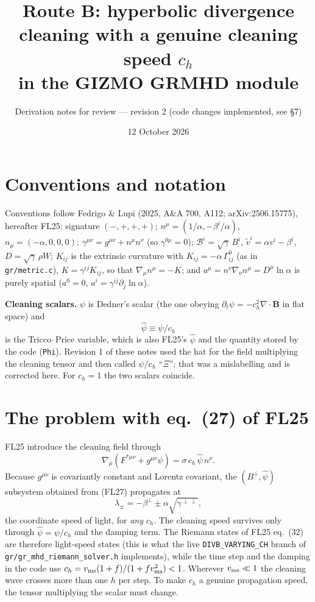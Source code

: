 \documentclass[11pt,a4paper]{article}
\title{Route B: hyperbolic divergence cleaning with a genuine cleaning speed $c_h$\\ in the GIZMO GRMHD module}
\author{Derivation notes for review --- revision 2 (code changes implemented, see \S7)}
\date{12 October 2026}
\newcommand{\cB}{\mathcal{B}}
\newcommand{\ph}{\hat\psi}
\newcommand{\ch}{c_h}
\newcommand{\pd}{\partial}
\newcommand{\sg}{\sqrt{\gamma}}
\newcommand{\code}[1]{\texttt{#1}}
\begin{document}
\maketitle

\section*{Conventions and notation}
Conventions follow Fedrigo \& Lupi (2025, A\&A 700, A112; arXiv:2506.15775), hereafter FL25:
signature $(-,+,+,+)$; $n^\mu=(1/\alpha,-\beta^i/\alpha)$, $n_\mu=(-\alpha,0,0,0)$;
$\gamma^{\mu\nu}=g^{\mu\nu}+n^\mu n^\nu$ (so $\gamma^{0\mu}=0$);
$\cB^i=\sg\,B^i$, $\tilde v^i=\alpha v^i-\beta^i$, $D=\sg\,\rho W$;
$K_{ij}$ is the extrinsic curvature with $K_{ij}=-\alpha\,\Gamma^0_{ij}$ (as in \code{gr/metric.c}),
$K=\gamma^{ij}K_{ij}$, so that $\nabla_\mu n^\mu=-K$; and
$a^\mu=n^\nu\nabla_\nu n^\mu=D^\mu\ln\alpha$ is purely spatial ($a^0=0$, $a^i=\gamma^{ij}\pd_j\ln\alpha$).

\textbf{Cleaning scalars.} $\psi$ is Dedner's scalar (the one obeying $\pd_t\psi=-\ch^2\nabla\!\cdot\!\bm B$ in flat space) and
\begin{equation}
\ph\equiv\psi/\ch
\end{equation}
is the Tricco--Price variable, which is also FL25's $\ph$ and the quantity stored by the code (\code{Phi}). Revision 1 of these notes used the hat for the field multiplying the cleaning tensor and then called $\psi/\ch$ ``$\Xi$''; that was a mislabelling and is corrected here. For $\ch=1$ the two scalars coincide.

\section{The problem with eq.~(27) of FL25}
FL25 introduce the cleaning field through
\begin{equation}
\nabla_\mu\!\left(F^{*\mu\nu}+g^{\mu\nu}\ph\right)=\sigma\,\ch\,\ph\,n^\nu .
\tag{FL27}
\end{equation}
Because $g^{\mu\nu}$ is covariantly constant and Lorentz covariant, the $(B^\perp,\ph)$ subsystem obtained from (FL27) propagates at
\begin{equation}
\lambda_\pm=-\beta^\perp\pm\alpha\sqrt{\gamma^{\perp\perp}},
\end{equation}
the coordinate speed of light, for \emph{any} $\ch$. The cleaning speed survives only through $\ph=\psi/\ch$ and the damping term. The Riemann states of FL25 eq.~(32) are therefore light-speed states (this is what the live \code{DIVB\_VARYING\_CH} branch of \code{gr/gr\_mhd\_riemann\_solver.h} implements), while the time step and the damping in the code use $\ch=v_{\rm ms}(1+f)/(1+f v_{\rm ms}^2)<1$. Wherever $v_{\rm ms}\ll1$ the cleaning wave crosses more than one $h$ per step. To make $\ch$ a genuine propagation speed, the tensor multiplying the scalar must change.
\end{document}

